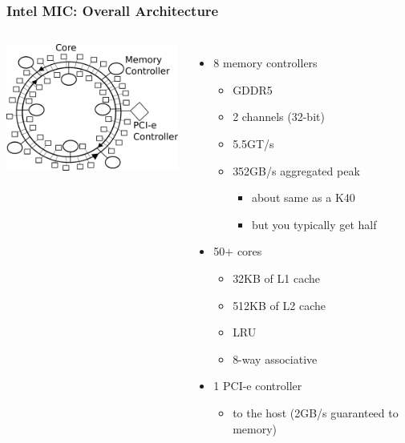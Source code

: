 \documentclass{beamer}
\newcommand{\MIC}{Intel MIC\xspace}
\begin{document}


\begin{frame}
  \frametitle{Intel MIC: Overall Architecture}
  \begin{columns}
    \column{18em}    
    \includegraphics[width=18em]{slides-figures/MIC-overview.pdf}
    \column{17em}
    
    \begin{itemize}
      \item 8 memory controllers
        \begin{itemize}
          \item GDDR5
          \item 2 channels (32-bit)
          \item 5.5GT/s
          \item 352GB/s aggregated peak
            \begin{itemize}
              \item about same as a K40 
              \item but you typically get half
            \end{itemize}
        \end{itemize}
      \item 50+ cores
        \begin{itemize}
          \item 32KB of L1 cache
          \item 512KB of L2 cache
          \item LRU
          \item 8-way associative
        \end{itemize}
      \item 1 PCI-e controller
        \begin{itemize}
          \item to the host (2GB/s guaranteed to memory)
        \end{itemize}
    \end{itemize}
  \end{columns}


\end{frame}
\end{document}
